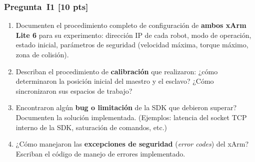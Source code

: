 \documentclass[journal,10pt,twoside]{IEEEtran}
\newcommand{\pts}[1]{\textbf{\color{tec_red}[#1 pts]}}
\begin{document}
\subsubsection*{Pregunta~I1 \pts{10}}
\begin{enumerate}[label=(\alph*)]
  \item Documenten el procedimiento completo de configuración de
        \textbf{ambos xArm Lite 6} para su experimento:
        dirección IP de cada robot, modo de operación, estado inicial,
        parámetros de seguridad (velocidad máxima, torque máximo,
        zona de colisión).
  \item Describan el procedimiento de \textbf{calibración} que realizaron:
        ¿cómo determinaron la posición inicial del maestro y el esclavo?
        ¿Cómo sincronizaron sus espacios de trabajo?
  \item Encontraron algún \textbf{bug o limitación} de la SDK que
        debieron superar? Documenten la solución implementada.
        (Ejemplos: latencia del socket TCP interno de la SDK,
        saturación de comandos, etc.)
  \item ¿Cómo manejaron las \textbf{excepciones de seguridad}
        (\textit{error codes}) del xArm? Escriban el código de
        manejo de errores implementado.
\end{enumerate}
    
\end{document}
